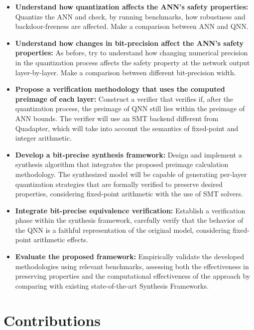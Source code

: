 \begin{itemize}
    \item \textbf{Understand how quantization affects the ANN's safety properties:} Quantize the ANN and check, by running benchmarks, how robustness and backdoor-freeness are affected. Make a comparison between ANN and QNN.
    
    \item \textbf{Understand how changes in bit-precision affect the ANN's safety properties:} As before, try to understand how changing numerical precision in the quantization process affects the safety property at the network output layer-by-layer. Make a comparison between different bit-precision width.
    
    \item \textbf{   Propose a verification methodology that uses the computed preimage of each layer:} Construct a verifier that verifies if, after the quantization process, the preimage of QNN still lies within the preimage of ANN bounds. The verifier will use an SMT backend different from Quadapter, which will take into account the semantics of fixed-point and integer arithmetic.
   
    \item \textbf{Develop a bit-precise synthesis framework:} Design and implement a synthesis algorithm that integrates the proposed preimage calculation methodology. The synthesized model will be capable of generating per-layer quantization strategies that are formally verified to preserve desired properties, considering fixed-point arithmetic with the use of SMT solvers.
   
    \item \textbf{   Integrate bit-precise equivalence verification:} Establish a verification phase within the synthesis framework, carefully verify that the behavior of the QNN is a faithful representation of the original model, considering
    fixed-point arithmetic effects.

    
    \item \textbf{Evaluate the proposed framework:} Empirically validate the developed methodologies using relevant benchmarks, assessing both the effectiveness in preserving properties and the computational effectiveness of the approach by comparing with existing state-of-the-art Synthesis Frameworks.
\end{itemize}




\section{Contributions}\label{sec:contributions}

